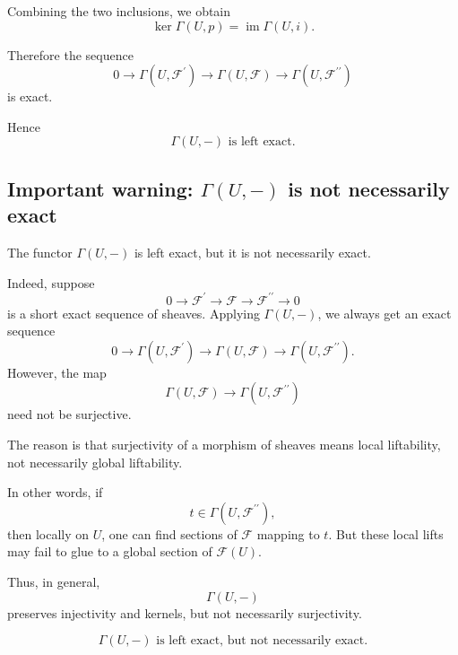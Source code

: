 Combining the two inclusions, we obtain
\[
\ker \Gamma(U,p)=\operatorname{im} \Gamma(U,i).
\]

Therefore the sequence
\[
0\longrightarrow \Gamma(U,\mathcal{F}^{\prime})
\longrightarrow \Gamma(U,\mathcal{F})
\longrightarrow \Gamma(U,\mathcal{F}^{\prime\prime})
\]
is exact.

Hence
\[
\boxed{
	\Gamma(U,-)\text{ is left exact.}
}
\]

\subsection[Important warning: Gamma(U,-) is not necessarily exact]{Important warning: \texorpdfstring{\(\Gamma(U,-)\)}{Gamma(U,-)} is not necessarily exact}

The functor \(\Gamma(U,-)\) is left exact, but it is not necessarily exact.

Indeed, suppose
\[
0\longrightarrow \mathcal{F}^{\prime}
\longrightarrow \mathcal{F}
\longrightarrow \mathcal{F}^{\prime\prime}
\longrightarrow 0
\]
is a short exact sequence of sheaves. Applying \(\Gamma(U,-)\), we always get an exact sequence
\[
0\longrightarrow \Gamma(U,\mathcal{F}^{\prime})
\longrightarrow \Gamma(U,\mathcal{F})
\longrightarrow \Gamma(U,\mathcal{F}^{\prime\prime}).
\]
However, the map
\[
\Gamma(U,\mathcal{F})\longrightarrow \Gamma(U,\mathcal{F}^{\prime\prime})
\]
need not be surjective.

The reason is that surjectivity of a morphism of sheaves means local liftability, not necessarily global liftability.

In other words, if
\[
t\in \Gamma(U,\mathcal{F}^{\prime\prime}),
\]
then locally on \(U\), one can find sections of \(\mathcal{F}\) mapping to \(t\). But these local lifts may fail to glue to a global section of \(\mathcal{F}(U)\).

Thus, in general,
\[
\Gamma(U,-)
\]
preserves injectivity and kernels, but not necessarily surjectivity.

\[
\boxed{
	\Gamma(U,-)\text{ is left exact, but not necessarily exact.}
}
\]
